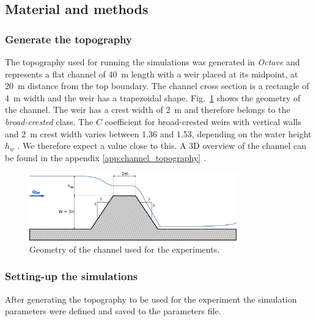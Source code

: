 \subsection{Material and methods}
\subsubsection{Generate the topography}
The topography used for running the simulations was generated in \textit{Octave} and represents a flat channel of \SI{40}{\meter} length with a weir placed at its midpoint, at \SI{20}{\meter} distance from the top boundary.
The channel cross section is a rectangle of \SI{4}{\meter} width and the weir has a trapezoidal shape.
Fig.~\ref{fig:weir_scheme} shows the geometry of the channel.
The weir has a crest width of \SI{2}{\meter} and therefore belongs to the \emph{broad-crested} class. The $C$ coefficient for broad-crested weirs with vertical walls and \SI{2}{\meter} crest width varies between \num{1.36} and \num{1.53}, depending on the water height $h_w$ \autocite{brown_urban_2009}.
We therefore expect a value close to this.
A 3D overview of the channel can be found in the appendix \ref{app:channel_topography} .

\begin{figure}[h]
  \centering
  \includegraphics[width=0.8\textwidth]{Figures/weir_scheme.png}
  \caption{Geometry of the channel used for the experiments.}
  \label{fig:weir_scheme}
\end{figure}

\subsubsection{Setting-up the simulations}
After generating the topography to be used for the experiment the simulation parameters were defined and saved to the parameters file.

